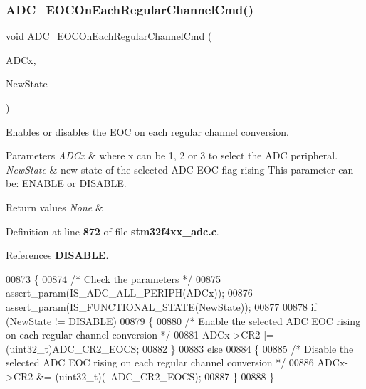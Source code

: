 \subsubsection{A\+D\+C\+\_\+\+E\+O\+C\+On\+Each\+Regular\+Channel\+Cmd()}
{\footnotesize\ttfamily void A\+D\+C\+\_\+\+E\+O\+C\+On\+Each\+Regular\+Channel\+Cmd (\begin{DoxyParamCaption}\item[{\textbf{ A\+D\+C\+\_\+\+Type\+Def} $\ast$}]{A\+D\+Cx,  }\item[{\textbf{ Functional\+State}}]{New\+State }\end{DoxyParamCaption})}



Enables or disables the E\+OC on each regular channel conversion. 


\begin{DoxyParams}{Parameters}
{\em A\+D\+Cx} & where x can be 1, 2 or 3 to select the A\+DC peripheral. \\
\hline
{\em New\+State} & new state of the selected A\+DC E\+OC flag rising This parameter can be\+: E\+N\+A\+B\+LE or D\+I\+S\+A\+B\+LE. \\
\hline
\end{DoxyParams}

\begin{DoxyRetVals}{Return values}
{\em None} & \\
\hline
\end{DoxyRetVals}


Definition at line \textbf{ 872} of file \textbf{ stm32f4xx\+\_\+adc.\+c}.



References \textbf{ D\+I\+S\+A\+B\+LE}.


\begin{DoxyCode}
00873 \{
00874   \textcolor{comment}{/* Check the parameters */}
00875   assert_param(IS_ADC_ALL_PERIPH(ADCx));
00876   assert_param(IS_FUNCTIONAL_STATE(NewState));
00877   
00878   \textcolor{keywordflow}{if} (NewState != DISABLE)
00879   \{
00880     \textcolor{comment}{/* Enable the selected ADC EOC rising on each regular channel conversion */}
00881     ADCx->CR2 |= (uint32\_t)ADC_CR2_EOCS;
00882   \}
00883   \textcolor{keywordflow}{else}
00884   \{
00885     \textcolor{comment}{/* Disable the selected ADC EOC rising on each regular channel conversion */}
00886     ADCx->CR2 &= (uint32\_t)(~ADC_CR2_EOCS);
00887   \}
00888 \}
\end{DoxyCode}
\mbox{\label{group__ADC__Group4_gaaf74221c285ec5dab5e66baf7bec6bd3}} 
